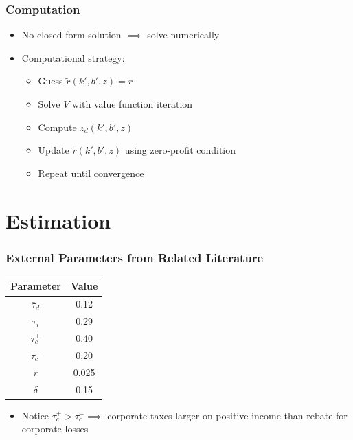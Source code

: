 \documentclass[usenames,dvipsnames, handout]{beamer}
\begin{document}
\begin{frame}
\frametitle{Computation}
\small
\begin{itemize}
\item No closed form solution $\implies$ solve numerically
\bigskip
\item Computational strategy:
\begin{itemize}
\item Guess $\tilde r (k', b', z) = r$
\item Solve $V$ with value function iteration
\item Compute $z_d(k', b', z)$
\item Update $\tilde r(k', b', z)$ using zero-profit condition
\item Repeat until convergence
\end{itemize}
\end{itemize}
\end{frame}


\section{Estimation}

\begin{frame}
\frametitle{External Parameters from Related Literature}
\small
\begin{center}
\begin{tabular}{ cc } 
 \hline
 Parameter    & Value \\ 
 \hline
 $\bar\tau_d$ & 0.12 \\ 
 $\tau_i$     & 0.29 \\ 
 $\tau_c^+$   & 0.40 \\ 
 $\tau_c^-$   & 0.20 \\ 
 $r$          & 0.025 \\
 $\delta$     & 0.15 \\
 \hline 
\end{tabular}
\end{center}
\begin{itemize}
\item Notice $\tau_c^+ > \tau_c^- \implies$ corporate taxes larger on positive income than rebate for corporate losses 
\end{itemize}
\end{frame}
\end{document}
